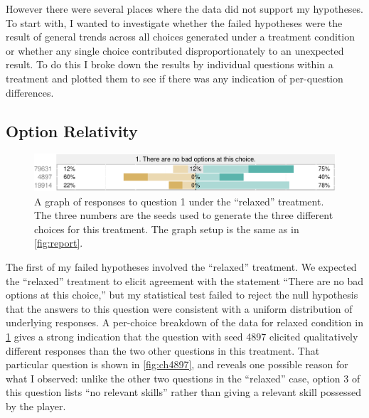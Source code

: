 However there were several places where the data did not support my hypotheses.
%
To start with, I wanted to investigate whether the failed hypotheses were the result of general trends across all choices generated under a treatment condition or whether any single choice contributed disproportionately to an unexpected result.
%
To do this I broke down the results by individual questions within a treatment and plotted them to see if there was any indication of per-question differences.


\subsection{Option Relativity}


\begin{figure}[!h]
  \includegraphics[width=\textwidth]{fig/relaxed-q1.pdf}
  \caption{A graph of responses to question 1 under the ``relaxed'' treatment. The three numbers are the seeds used to generate the three different choices for this treatment. The graph setup is the same as in \cref{fig:report}.}
  \label{fig:relaxedq1}
\end{figure}


The first of my failed hypotheses involved the ``relaxed'' treatment.
%
We expected the ``relaxed'' treatment to elicit agreement with the statement ``There are no bad options at this choice,'' but my statistical test failed to reject the null hypothesis that the answers to this question were consistent with a uniform distribution of underlying responses.
%
A per-choice breakdown of the data for relaxed condition in \cref{fig:relaxedq1} gives a strong indication that the question with seed 4897 elicited qualitatively different responses than the two other questions in this treatment.
%
That particular question is shown in \cref{fig:ch4897}, and reveals one possible reason for what I observed: unlike the other two questions in the ``relaxed'' case, option 3 of this question lists ``no relevant skills'' rather than giving a relevant skill possessed by the player.


